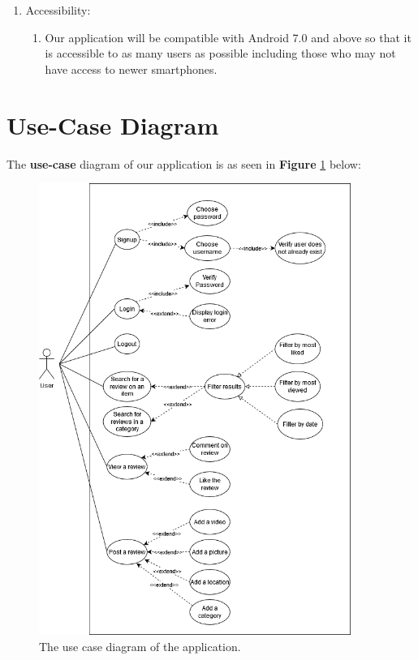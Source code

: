 \documentclass[11pt]{extarticle}
\begin{document}
\begin{enumerate}
\begin{enumerate}
                    \end{enumerate}
    \item Accessibility:
                    \begin{enumerate}
                        \item Our application will be compatible with Android 7.0 and above so that it is accessible to as many users as possible including those who may not have access to newer smartphones.
                    \end{enumerate}
\end{enumerate}

\newpage
\justify
\section{Use-Case Diagram}
The \textbf{use-case} diagram of our application is as seen in \textbf{Figure} \ref{fig:use-case} below:
\begin{center}
    \begin{figure}[H]
        \centering
        \includegraphics[width=4in]{Figures/Meri Raye Use Case.png}
        \caption{The use case diagram of the application.}
        \label{fig:use-case}
    \end{figure}
\end{center}
\end{document}
